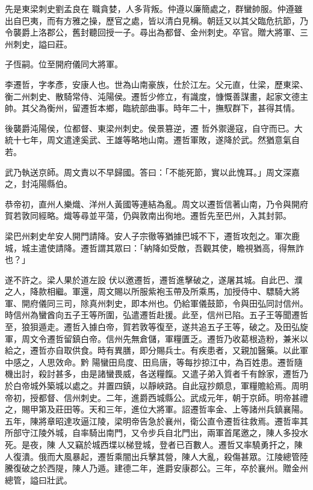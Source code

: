 \begin{pinyinscope}
 先是東梁刺史劉孟良在
 職貪婪，人多背叛。仲遵以廉簡處之，群蠻帥服。仲遵雖出自巴夷，而有方雅之操，歷官之處，皆以清白見稱。朝廷又以其父臨危抗節，乃令襲爵上洛郡公，舊封聽回授一子。尋出為都督、金州刺史。卒官。贈大將軍、三州刺史，謚曰莊。



 子恆嗣。位至開府儀同大將軍。



 李遷哲，字孝彥，安康人也。世為山南豪族，仕於江左。父元直，仕梁，歷東梁、衡二州刺史、散騎常侍、沌陽侯。遷哲少修立，有識度，慷慨善謀畫，起家文德主帥。其父為衡州，留遷哲本鄉，臨統部曲事。時年二十，撫馭群下，甚得其情。



 後襲爵沌陽侯，位都督、東梁州刺史。侯景篡逆，遷
 哲外禦邊寇，自守而已。大統十七年，周文遣達奚武、王雄等略地山南。遷哲軍敗，遂降於武。然猶意氣自若。



 武乃執送京師。周文責以不早歸國。答曰：「不能死節，實以此愧耳。」周文深嘉之，封沌陽縣伯。



 恭帝初，直州人樂熾、洋州人黃國等連結為亂。周文以遷哲信著山南，乃令與開府賀若敦同經略。熾等尋並平蕩，仍與敦南出徇地。遷哲先至巴州，入其封郭。



 梁巴州剌史牟安人開門請降。安人子宗徹等猶據巴城不下，遷哲攻剋之。軍次鹿城，城主遣使請降。遷哲謂其眾曰：「納降如受敵，吾觀其使，瞻視猶高，得無詐也？」



 遂不許之。梁人果於道左設
 伏以邀遷哲，遷哲進擊破之，遂屠其城。自此巴、濮之人，降款相繼。軍還，周文賜以所服紫袍玉帶及所乘馬，加授侍中、驃騎大將軍、開府儀同三司，除真州刺史，即本州也。仍給軍儀鼓節，令與田弘同討信州。時信州為蠻酋向五子王等所圍，弘遣遷哲赴援。此至，信州已陷。五子王等聞遷哲至，狼狽遁走。遷哲入據白帝，賀若敦等復至，遂共追五子王等，破之。及田弘旋軍，周文令遷哲留鎮白帝。信州先無倉儲，軍糧匱乏。遷哲乃收葛根造粉，兼米以給之，遷哲亦自取供食。時有異膳，即分賜兵士。有疾患者，又親加醫藥。以此軍中感之，人思效命。黔
 陽蠻田烏度、田烏唐，等每抄掠江中，為百姓患。遷哲隨機出討，殺討甚多，由是諸蠻畏威，各送糧餼。又遣子弟入質者千有餘家，遷哲乃於白帝城外築城以處之。并置四鎮，以靜峽路。自此寇抄頗息，軍糧贍給焉。周明帝初，授都督、信州刺史。二年，進爵西城縣公。武成元年，朝于京師。明帝甚禮之，賜甲第及莊田等。天和三年，進位大將軍。詔遷哲率金、上等諸州兵鎮襄陽。五年，陳將章昭達攻逼江陵，梁明帝告急於襄州，衛公直令遷哲往救焉。遷哲率其所部守江陵外城，自率騎出南門，又令步兵自北門出，兩軍首尾邀之，陳人多投水死。是夜，陳
 人又竊於城西堞以梯登城，登者已百數人。遷哲又率驍勇扞之，陳人復潰。俄而大風暴起，遷哲乘闇出兵擊其營，陳人大亂，殺傷甚眾。江陵總管陸騰復破之於西隄，陳人乃遁。建德二年，進爵安康郡公。三年，卒於襄州。贈金州總管，謚曰壯武。




\end{pinyinscope}

